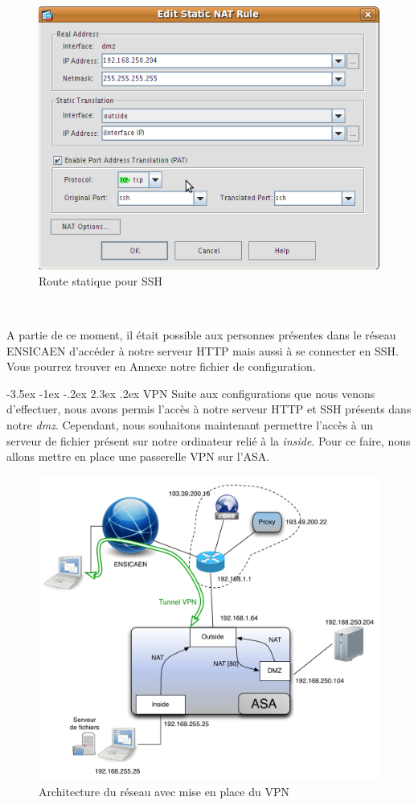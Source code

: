 \documentclass[a4paper,12pt]{article}
\makeatletter
\renewcommand\section{\@startsection {section}{1}{\z@}%
                           {-3.5ex \@plus -1ex \@minus -.2ex}%
                           {2.3ex \@plus.2ex}%
                           {\normalfont\Large\bfseries}}
\makeatother
\begin{document}
\begin{figure}[H]
	\center
	\includegraphics[width=12cm]{img/20-natstaticdmzssh.png}
	\caption{Route statique pour SSH}
\end{figure}

~

A partie de ce moment, il était possible aux personnes présentes dans le réseau ENSICAEN d'accéder à notre serveur HTTP mais aussi à se connecter en SSH.
Vous pourrez trouver en Annexe notre fichier de configuration.

\newpage
\section{VPN}
Suite aux configurations que nous venons d'effectuer, nous avons permis l'accès à notre serveur HTTP et SSH présents dans notre \textit{dmz}.
Cependant, nous souhaitons maintenant permettre l'accès à un serveur de fichier présent sur notre ordinateur relié à la \textit{inside}. Pour ce faire,
nous allons mettre en place une passerelle VPN sur l'ASA.

\begin{figure}[H]
	\center
	\includegraphics[width=12cm]{img/reseau_VPN.pdf}
	\caption{Architecture du réseau avec mise en place du VPN}
\end{figure}
\end{document}
